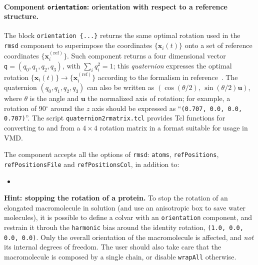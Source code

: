 \paragraph*{Component \texttt{orientation}: orientation with respect
  to a reference structure.}  The block \texttt{orientation~\{...\}}
returns the same optimal rotation used in the \texttt{rmsd} component
to superimpose the coordinates $\{\mathbf{x}_{i}(t)\}$ onto a set of
reference coordinates $\{\mathbf{x}_{i}^{\mathrm{(ref)}}\}$.  Such
component returns a four dimensional vector $\mathsf{q} = (q_0, q_1,
q_2, q_3)$, with $\sum_{i} q_{i}^{2} = 1$; this \emph{quaternion}
expresses the optimal rotation $\{\mathbf{x}_{i}(t)\} \rightarrow
\{\mathbf{x}_{i}^{\mathrm{(ref)}}\}$ according to the formalism in
reference~\cite{Coutsias2004}.  The quaternion $(q_0, q_1, q_2, q_3)$
can also be written as $\left(\cos(\theta/2), \,
  \sin(\theta/2)\mathbf{u}\right)$, where $\theta$ is the angle and
$\mathbf{u}$ the normalized axis of rotation; for example, a rotation
of 90$^{\circ}$ around the $z$ axis should be expressed as
``\texttt{(0.707, 0.0, 0.0, 0.707)}''.  The script
\texttt{quaternion2rmatrix.tcl} provides Tcl functions for converting
to and from a $4\times{}4$ rotation matrix in a format suitable for
usage in VMD.

The component accepts all the options of \texttt{rmsd}:
\texttt{atoms}, \texttt{refPositions}, \texttt{refPositionsFile} and
\texttt{refPositionsCol}, in addition to:

\begin{itemize}

\item %

\end{itemize}

\textbf{Hint: stopping the rotation of a protein.}  To stop the
rotation of an elongated macromolecule in solution (and use an
anisotropic box to save water molecules), it is possible to define a
colvar with an \texttt{orientation} component, and restrain it throuh
the \texttt{harmonic} bias around the identity rotation, \texttt{(1.0,
  0.0, 0.0, 0.0)}.  Only the overall orientation of the macromolecule
is affected, and \emph{not} its internal degrees of freedom.  The user
should also take care that the macromolecule is composed by a single
chain, or disable \texttt{wrapAll} otherwise.


